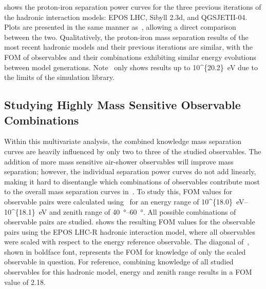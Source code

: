  shows the proton-iron separation power curves for the three previous iterations of the hadronic interaction models: EPOS LHC, Sibyll 2.3d, and QGSJETII-04.
Plots are presented in the same manner as~, allowing a direct comparison between the two.
Qualitatively, the proton-iron mass separation results of the most recent hadronic models and their previous iterations are similar, with the FOM of observables and their combinations exhibiting similar energy evolutions between model generations.
Note~ only shows results up to \qty[parse-numbers=false]{10^{20.2}}{\electronvolt} due to the limits of the simulation library.

\subsection{Studying Highly Mass Sensitive Observable Combinations}\label{ssec:combinations}
Within this multivariate analysis, the combined knowledge mass separation curves are heavily influenced by only two to three of the studied observables.
The addition of more mass sensitive air-shower observables will improve mass separation; however, the individual separation power curves do not add linearly, making it hard to disentangle which combinations of observables contribute most to the overall mass separation curves in~.
To study this, FOM values for observable pairs were calculated using~ for an energy range of \qtyrange[parse-numbers=false]{10^{18.0}}{10^{18.1}}{\electronvolt} and zenith range of \qtyrange{40}{60}{\degree}.
All possible combinations of observable pairs are studied.
 shows the resulting FOM values for the observable pairs using the EPOS LHC-R hadronic interaction model, where all observables were scaled with respect to the energy reference observable.
The diagonal of~, shown in boldface font, represents the FOM for knowledge of only the scaled observable in question.
For reference, combining knowledge of all studied observables for this hadronic model, energy and zenith range results in a FOM value of 2.18.

